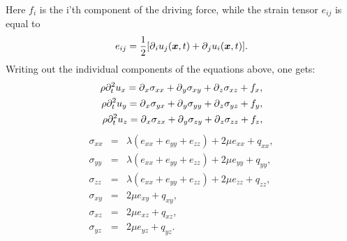 \documentclass[11pt]{article}
\begin{document}
%
Here $f_i$ is the i'th component of the driving force, while the strain
tensor $e_{ij}$
is equal to
%
\begin{eqnarray}
    e_{ij} = \frac{1}{2}[\mbox{$\partial$}_i u_j(\mbox{\boldmath $x$}, t) + \mbox{$\partial$}_j u_i(\mbox{\boldmath $x$},t)].
					  \label{eq:iso-strain}
\end{eqnarray}
%
Writing out the individual components of the equations above, one gets:
%
\begin{eqnarray}
  \rho \partial^2_t{u}_x = \mbox{$\partial$}_x \sigma_{xx} +\mbox{$\partial$}_y \sigma_{xy} +\mbox{$\partial$}_z  \sigma_{xz} 
                                                      + f_x, \nonumber\\
  \rho \partial^2_t{u}_y = \mbox{$\partial$}_x \sigma_{yx} +\mbox{$\partial$}_y \sigma_{yy} +\mbox{$\partial$}_z  \sigma_{yz} 
                                                      + f_y, \nonumber\\
  \rho \partial^2_t{u}_z = \mbox{$\partial$}_x \sigma_{zx} +\mbox{$\partial$}_y \sigma_{zy} +\mbox{$\partial$}_z  \sigma_{zz} 
                                                      + f_z, \nonumber\\
\end{eqnarray}
%
\begin{eqnarray}
  \sigma_{xx} & = & \lambda \left (e_{xx} + e_{yy} + e_{zz}\right)+ 2\mu e_{xx} 
                                                   +q_{xx}, \nonumber\\
  \sigma_{yy} & = & \lambda \left (e_{xx} + e_{yy} + e_{zz}\right)+ 2\mu e_{yy} 
                                                   +q_{yy}, \nonumber\\
  \sigma_{zz} & = & \lambda \left (e_{xx} + e_{yy} + e_{zz}\right)+ 2\mu e_{zz} 
                                                   +q_{zz}, \nonumber\\
  \sigma_{xy} & = & 2\mu e_{xy} +q_{xy}, \nonumber\\
  \sigma_{xz} & = & 2\mu e_{xz} +q_{xz}, \nonumber\\
  \sigma_{yz} & = & 2\mu e_{yz} +q_{yz}. \nonumber\\ 
\end{eqnarray}
%
\end{document}
